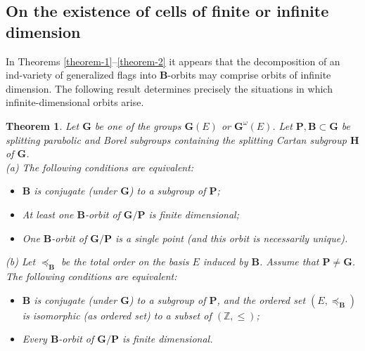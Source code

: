 \documentclass[12pt]{amsart}
\newtheorem{theorem}{Theorem}
\theoremstyle{definition}
\begin{document}
\subsection{On the existence of cells of finite or infinite dimension}

\label{section-4-4}

In Theorems \ref{theorem-1}--\ref{theorem-2} it appears that the decomposition of an ind-variety of generalized flags into $\mathbf{B}$-orbits may comprise orbits of infinite dimension.
The following result determines precisely the situations in which infinite-dimensional orbits arise.

\begin{theorem}
\label{theorem-3}
Let $\mathbf{G}$ be one of the groups $\mathbf{G}(E)$ or $\mathbf{G}^\omega(E)$. Let $\mathbf{P},\mathbf{B}\subset\mathbf{G}$ be splitting parabolic and Borel subgroups containing the splitting Cartan subgroup $\mathbf{H}$ of $\mathbf{G}$.  \\
{\rm (a)} The following conditions are equivalent:
\begin{itemize}
\item[\rm (i)] $\mathbf{B}$ is conjugate (under $\mathbf{G}$) to a subgroup of $\mathbf{P}$;
\item[\rm (ii)] At least one $\mathbf{B}$-orbit of $\mathbf{G}/\mathbf{P}$ is finite dimensional; \item[\rm (iii)] One $\mathbf{B}$-orbit of $\mathbf{G}/\mathbf{P}$ is a single point (and this orbit is necessarily unique).
\end{itemize}
{\rm (b)} Let $\preceq_\mathbf{B}$ be the total order on the basis $E$ induced by $\mathbf{B}$. Assume that $\mathbf{P}\not=\mathbf{G}$. The following conditions are equivalent:
\begin{itemize}
\item[\rm (i)] $\mathbf{B}$ is conjugate (under $\mathbf{G}$) to a subgroup of $\mathbf{P}$, and the ordered set $(E,\preceq_\mathbf{B})$ is isomorphic (as ordered set) to a subset of $(\mathbb{Z},\leq)$;
\item[\rm (ii)] Every $\mathbf{B}$-orbit of $\mathbf{G}/\mathbf{P}$ is finite dimensional.
\end{itemize}
\end{theorem}
\end{document}
